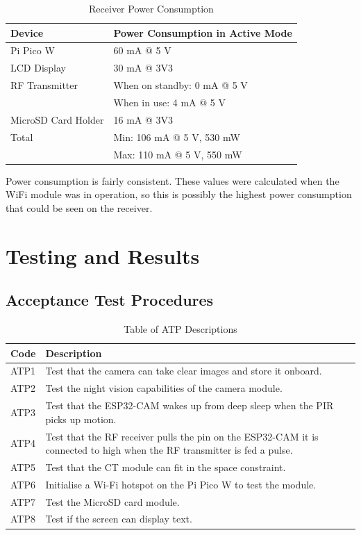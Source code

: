 \documentclass[class=report,11pt,crop=false]{standalone}
\begin{document}
\begin{table}[h]
\centering
\begin{tabular}{|l|l|}
\hline
\textbf{Device} & \textbf{Power Consumption in Active Mode} \\
\hline
Pi Pico W & 60 mA @ 5 V \\
\hline
LCD Display & 30 mA @ 3V3 \\
\hline
RF Transmitter & When on standby: 0 mA @ 5 V \\
& When in use: 4 mA @ 5 V \\
\hline
MicroSD Card Holder & 16 mA @ 3V3 \\
\hline
Total & Min: 106 mA @ 5 V, 530 mW \\
& Max: 110 mA @ 5 V, 550 mW \\
\hline
\end{tabular}
\caption{Receiver Power Consumption}
\label{tab:R_PWR}
\end{table}

Power consumption is fairly consistent. These values were calculated when the WiFi module was in operation, so this is possibly the highest power consumption that could be seen on the receiver. 

\section{Testing and Results}
\subsection{Acceptance Test Procedures}

\begin{table}[h]
\centering
\begin{tabular}{|p{1cm}|p{15cm}|}
\hline
\textbf{Code} & \textbf{Description} \\
\hline
ATP1 & Test that the camera can take clear images and store it onboard.\\
\hline
ATP2 & Test the night vision capabilities of the camera module. \\
\hline
ATP3 & Test that the ESP32-CAM wakes up from deep sleep when the PIR picks up motion. \\ 
\hline
ATP4 & Test that the RF receiver pulls the pin on the ESP32-CAM it is connected to high when the RF transmitter is fed a pulse.\\ 
\hline
ATP5 & Test that the CT module can fit in the space constraint. \\
\hline
ATP6 & Initialise a Wi-Fi hotspot on the Pi Pico W to test the module. \\ 
\hline
ATP7 & Test the MicroSD card module.\\ 
\hline
ATP8 & Test if the screen can display text. \\ 
\hline
\end{tabular}
\caption{Table of ATP Descriptions}
\label{tab:ATPs_Criteria}
\end{table}
\end{document}
